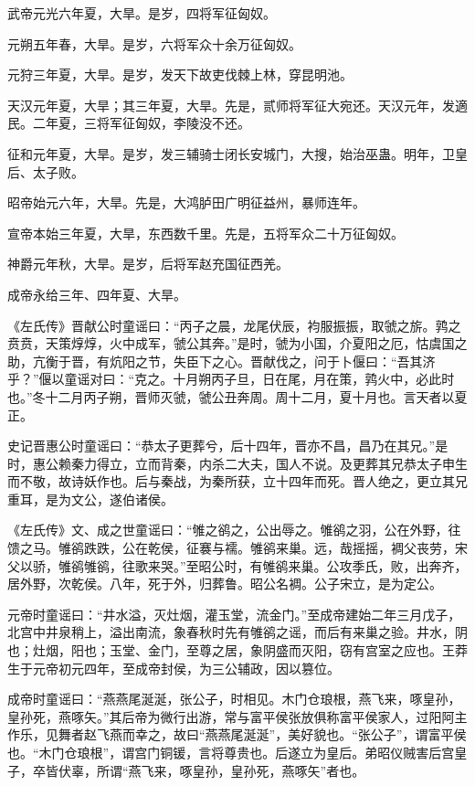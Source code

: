 \documentclass[]{article}
\begin{document}
武帝元光六年夏，大旱。是岁，四将军征匈奴。

元朔五年春，大旱。是岁，六将军众十余万征匈奴。

元狩三年夏，大旱。是岁，发天下故吏伐棘上林，穿昆明池。

天汉元年夏，大旱；其三年夏，大旱。先是，贰师将军征大宛还。天汉元年，发適民。二年夏，三将军征匈奴，李陵没不还。

征和元年夏，大旱。是岁，发三辅骑士闭长安城门，大搜，始治巫蛊。明年，卫皇后、太子败。

昭帝始元六年，大旱。先是，大鸿胪田广明征益州，暴师连年。

宣帝本始三年夏，大旱，东西数千里。先是，五将军众二十万征匈奴。

神爵元年秋，大旱。是岁，后将军赵充国征西羌。

成帝永给三年、四年夏、大旱。

《左氏传》晋献公时童谣曰：``丙子之晨，龙尾伏辰，袀服振振，取虢之旂。鹑之贲贲，天策焞焞，火中成军，虢公其奔。''是时，虢为小国，介夏阳之厄，怙虞国之助，亢衡于晋，有炕阳之节，失臣下之心。晋献伐之，问于卜偃曰：``吾其济乎？''偃以童谣对曰：``克之。十月朔丙子旦，日在尾，月在策，鹑火中，必此时也。''冬十二月丙子朔，晋师灭虢，虢公丑奔周。周十二月，夏十月也。言天者以夏正。

史记晋惠公时童谣曰：``恭太子更葬兮，后十四年，晋亦不昌，昌乃在其兄。''是时，惠公赖秦力得立，立而背秦，内杀二大夫，国人不说。及更葬其兄恭太子申生而不敬，故诗妖作也。后与秦战，为秦所获，立十四年而死。晋人绝之，更立其兄重耳，是为文公，遂伯诸侯。

《左氏传》文、成之世童谣曰：``雊之鹆之，公出辱之。雊鹆之羽，公在外野，往馈之马。雊鹆跌跌，公在乾侯，征褰与襦。雊鹆来巢。远，哉摇摇，裯父丧劳，宋父以骄，雊鹆雊鹆，往歌来哭。''至昭公时，有雊鹆来巢。公攻季氏，败，出奔齐，居外野，次乾侯。八年，死于外，归葬鲁。昭公名裯。公子宋立，是为定公。

元帝时童谣曰：``井水溢，灭灶烟，灌玉堂，流金门。''至成帝建始二年三月戊子，北宫中井泉稍上，溢出南流，象春秋时先有雊鹆之谣，而后有来巢之验。井水，阴也；灶烟，阳也；玉堂、金门，至尊之居，象阴盛而灭阳，窃有宫室之应也。王莽生于元帝初元四年，至成帝封侯，为三公辅政，因以篡位。

成帝时童谣曰：``燕燕尾涎涎，张公子，时相见。木门仓琅根，燕飞来，啄皇孙，皇孙死，燕啄矢。''其后帝为微行出游，常与富平侯张放俱称富平侯家人，过阳阿主作乐，见舞者赵飞燕而幸之，故曰``燕燕尾涎涎''，美好貌也。``张公子''，谓富平侯也。``木门仓琅根''，谓宫门铜锾，言将尊贵也。后遂立为皇后。弟昭仪贼害后宫皇子，卒皆伏辜，所谓``燕飞来，啄皇孙，皇孙死，燕啄矢''者也。
\end{document}
